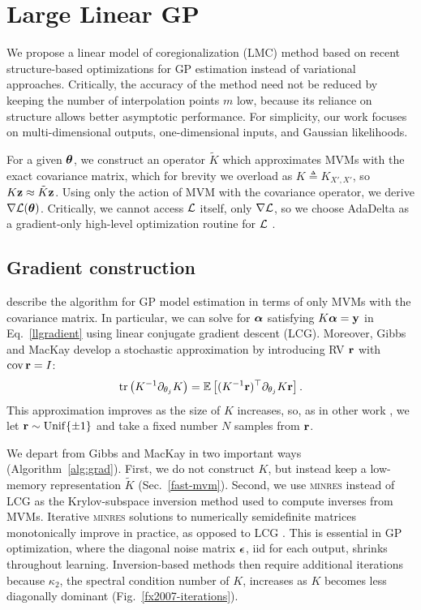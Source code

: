 \documentclass[twoside]{article}
\begin{document}
\section{Large Linear GP} \label{sec:matrix-free}

We propose a linear model of coregionalization (LMC) method based on recent structure-based optimizations for GP estimation instead of variational approaches. Critically, the accuracy of the method need not be reduced by keeping the number of interpolation points $m$ low, because its reliance on structure allows better asymptotic performance.
For simplicity, our work focuses on multi-dimensional outputs, one-dimensional inputs, and Gaussian likelihoods.

For a given ${\boldsymbol\theta}$, we construct an operator $\tilde{K}$ which approximates MVMs with the exact covariance matrix, which for brevity we overload as $K\triangleq K_{X',X'}$, so $K\textbf{z}\approx \tilde{K}\textbf{z}$. Using only the action of MVM with the covariance operator, we derive $\nabla\mathcal{L}({\boldsymbol\theta})$. Critically, we cannot access $\mathcal{L}$ itself, only $\nabla\mathcal{L}$, so we choose AdaDelta as a gradient-only high-level optimization routine for $\mathcal{L}$ \citep{zeiler2012adadelta}.


\subsection{Gradient construction}

\citet{gibbs1996cient} describe the algorithm for GP model estimation in terms of only MVMs with the covariance matrix. In particular, we can solve for ${\boldsymbol\alpha}$ satisfying $K{\boldsymbol\alpha}=\textbf{y}$ in Eq.~\ref{llgradient} using linear conjugate gradient descent (LCG). Moreover, Gibbs and MacKay develop a stochastic approximation by introducing RV ${\textbf{r}}$ with $\operatorname{cov} {\textbf{r}}=I$:
\begin{align}
  \operatorname{tr}\left({K^{-1}\partial_{\theta_j}K}\right) = \operatorname{\mathbb{E}}\left[(K^{-1}{\textbf{r}})^\top\partial_{\theta_j}K{\textbf{r}}\right]\label{eq:trace}.
\end{align}
This approximation improves as the size of $K$ increases, so, as in other work \citep{cutajar2016preconditioning}, we let ${\textbf{r}}\sim\operatorname{Unif}\{\pm 1\}$ and take a fixed number $N$ samples from ${\textbf{r}}$.

We depart from Gibbs and MacKay in two important ways (Algorithm~\ref{alg:grad}). First, we do not construct $K$, but instead keep a low-memory representation $\tilde{K}$ (Sec.~\ref{fast-mvm}). Second, we use \textsc{minres} instead of LCG as the Krylov-subspace inversion method used to compute inverses from MVMs. Iterative \textsc{minres} solutions to numerically semidefinite matrices monotonically improve in practice, as opposed to LCG \citep{fong2012cg}. This is essential in GP optimization, where the diagonal noise matrix ${\boldsymbol\epsilon}$, iid for each output, shrinks throughout learning. Inversion-based methods then require additional iterations because $\kappa_2$, the spectral condition number of $K$, increases as $K$ becomes less diagonally dominant (Fig.~\ref{fx2007-iterations}).
\end{document}
